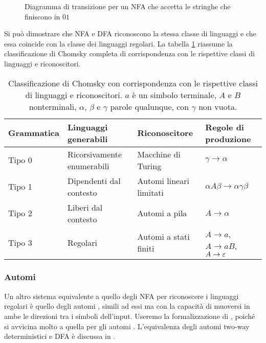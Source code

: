 \begin{figure}
	\centering
	
	\caption{Diagramma di transizione per un NFA che accetta le stringhe che finiscono in $01$}
\end{figure}

Si può dimostrare che NFA e DFA riconoscono la stessa classe di linguaggi e che essa coincide con la classe dei linguaggi regolari. La tabella \ref{tab:prel:chomskyhier} riassume la classificazione di Chomsky completa di corrispondenza con le rispettive classi di linguaggi e riconoscitori.

\begin{table}
	\caption{Classificazione di Chomsky con corrispondenza con le rispettive classi di linguaggi e riconoscitori. $a$ è un simbolo terminale, $A$ e $B$ nonterminali, $\alpha$, $\beta$ e $\gamma$ parole qualunque, con $\gamma$ non vuota.}
	\label{tab:prel:chomskyhier}
	\centering
	\begin{tabularx}{\textwidth}{lXXl}
		\toprule
		\textbf{Grammatica} & \textbf{Linguaggi generabili} & \textbf{Riconoscitore}  & \textbf{Regole di produzione}         \\
		\midrule
		Tipo 0              & Ricorsivamente enumerabili    & Macchine di Turing      & $\gamma\to\alpha$                     \\
		Tipo 1              & Dipendenti dal contesto       & Automi lineari limitati & $\alpha A\beta\to\alpha\gamma\beta$   \\
		Tipo 2              & Liberi dal contesto           & Automi a pila           & $A\to\alpha$                          \\
		Tipo 3              & Regolari                      & Automi a stati finiti   & $A\to a$, $A\to aB$, $A\to\varepsilon$ \\
		\bottomrule
	\end{tabularx}
\end{table}

\subsubsection{Automi }
Un altro sistema equivalente a quello degli NFA per riconoscere i linguaggi regolari è quello degli automi , simili ad essi ma con la capacità di muoversi in ambe le direzioni tra i simboli dell'input. Useremo la formalizzazione di \cite{Pighizzini:14:limitedRE}, poiché si avvicina molto a quella per gli automi . L'equivalenza degli automi two-way deterministici e DFA è discussa in \cite{Shallit:09:secondLFA}.

